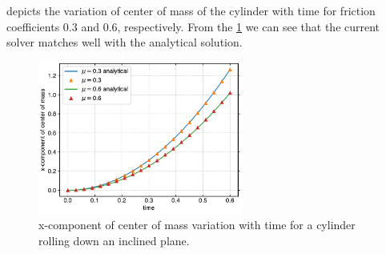  depicts the variation of center of mass of
the cylinder with time for friction coefficients $0.3$ and $0.6$,
respectively. From the \cref{fig:cylinder-xcom-vs-time} we can see that the
current solver matches well with the analytical solution.
\begin{figure}[!htpb]
  \centering
  \includegraphics[width=0.6\textwidth]{figures/rfc/figures/de_2021_cylinder_rolling_on_an_inclined_plane_2d/xcom_vs_time}
  \caption{x-component of center of mass variation with time for a cylinder
    rolling down an inclined plane.}
\label{fig:cylinder-xcom-vs-time}
\end{figure}


\FloatBarrier%
